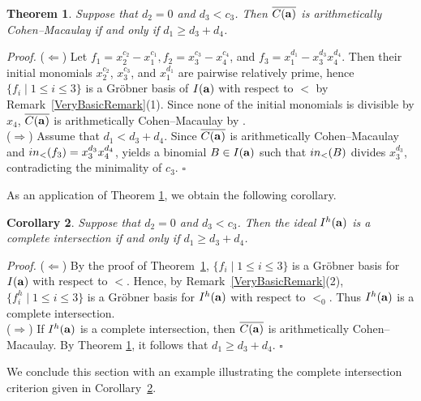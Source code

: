 \documentclass[10pt,a4paper]{amsart}
\newtheorem{thm1}{Theorem}[section]
\newtheorem{cor1}[thm1]{Corollary}
\begin{document}
\begin{thm1} \label{ACM4} Suppose that $d_2=0$ and $d_{3}<c_{3}$. Then $\overline{C({\bf a})}$ is arithmetically Cohen--Macaulay if and only if $d_{1} \geq d_{3}+d_{4}$.
\end{thm1}
{\em \noindent Proof.} ($\Leftarrow$) Let $f_{1}=x_2^{c_2}-x_1^{c_1}, f_{2}=x_3^{c_3}-x_4^{c_4}$, and $f_{3}=x_1^{d_1}-x_3^{d_3}x_4^{d_4}$. Then their initial monomials $x_2^{c_2}$, $x_3^{c_3}$, and $x_1^{d_1}$ are pairwise relatively prime, hence $\{f_i \mid 1 \leq i \leq 3 \}$ is a Gr\"obner basis of $I({\bf a})$ with respect to $<$ by Remark~\ref{VeryBasicRemark}(1). Since none of the initial monomials is divisible by $x_4$, $\overline{C({\bf a})}$ is arithmetically Cohen--Macaulay by \cite[Theorem 2.2]{HerSta}.\\
($\Rightarrow$) Assume that $d_{1}<d_{3}+d_{4}$. Since $\overline{C({\bf a})}$ is arithmetically Cohen--Macaulay and ${\rm in}_{<}(f_{3})=x_3^{d_3}x_4^{d_4}$, \cite[Theorem 2.2]{HerSta} yields a binomial $B \in I({\bf a})$ such that ${\rm in}_{<}(B)$ divides $x_3^{d_{3}}$, contradicting the minimality of $c_{3}$. \hfill $\square$ \par\vspace{0.5\baselineskip}

As an application of Theorem \ref{ACM4}, we obtain the following corollary. 

\begin{cor1} \label{CorCase1CI} Suppose that $d_2=0$ and $d_{3}<c_{3}$. Then the ideal $I^{h}({\bf a})$ is a complete intersection if and only if $d_{1} \geq d_{3}+d_{4}$.
\end{cor1}

{\em \noindent Proof.} ($\Leftarrow$) By the proof of Theorem~\ref{ACM4}, $\{f_i \mid 1\le i\le 3\}$ is a Gr\"obner basis for $I({\bf a})$ with respect to $<$. Hence, by Remark~\ref{VeryBasicRemark}(2), $\{f_i^{h} \mid 1\le i\le 3\}$ is a Gr\"obner basis for $I^{h}({\bf a})$ with respect to $<_0$. Thus $I^{h}({\bf a})$ is a complete intersection.\\ ($\Rightarrow$) If $I^{h}({\bf a})$ is a complete intersection, then $\overline{C({\bf a})}$ is arithmetically Cohen--Macaulay. By Theorem \ref{ACM4}, it follows that $d_{1} \geq d_{3}+d_{4}$. \hfill $\square$ \par\vspace{0.5\baselineskip}

We conclude this section with an example illustrating the complete intersection criterion given in Corollary~\ref{CorCase1CI}.
\end{document}
